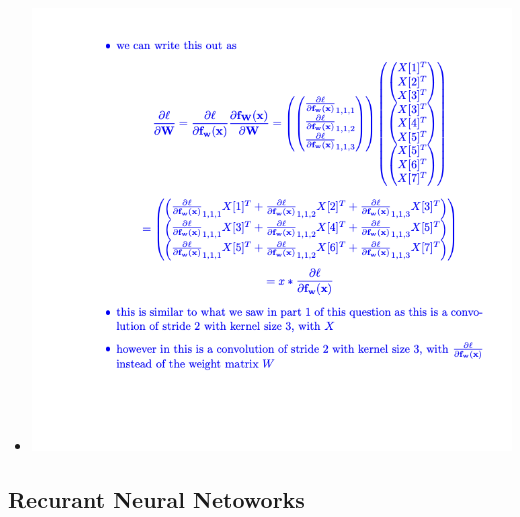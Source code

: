\documentclass{article}
\begin{document}
\begin{enumerate}[(a)]
\begin{enumerate}[i.]
\begin{itemize}
        \item \includegraphics*{./assigment_screenshots/part_3.png}
    \end{itemize}
\end{enumerate}

\end{enumerate}

\subsection{Recurant Neural Netoworks}
\end{document}

